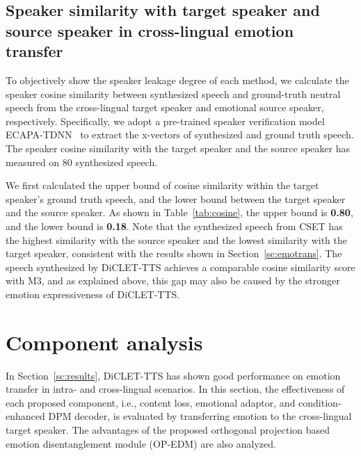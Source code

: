 \documentclass[journal,comsoc]{IEEEtran}
\begin{document}
\subsection{Speaker similarity with target speaker and source speaker in cross-lingual emotion transfer}

To objectively show the speaker leakage degree of each method, we calculate the speaker cosine similarity between synthesized speech and ground-truth neutral speech from the cross-lingual target speaker and emotional source speaker, respectively. 
Specifically, we adopt a pre-trained speaker verification model ECAPA-TDNN~\cite{TDNN} to extract the x-vectors of synthesized and ground truth speech. 
The speaker cosine similarity with the target speaker and the source speaker has measured on $80$ synthesized speech.

We first calculated the upper bound of cosine similarity within the target speaker's ground truth speech, and the lower bound between the target speaker and the source speaker. 
As shown in Table~\ref{tab:cosine}, the upper bound is \textbf{0.80}, and the lower bound is \textbf{0.18}.
Note that the synthesized speech from CSET has the highest similarity with the source speaker and the lowest similarity with the target speaker, consistent with the results shown in Section~\ref{sc:emotrans}.
The speech synthesized by DiCLET-TTS achieves a comparable cosine similarity score with M3, and as explained above, this gap may also be caused by the stronger emotion expressiveness of DiCLET-TTS. 

\vspace{-0.05cm}
\section{Component analysis}
\label{component}

In Section~\ref{sc:results}, DiCLET-TTS has shown good performance on emotion transfer in intra- and cross-lingual scenarios. 
In this section, the effectiveness of each proposed component, i.e., content loss, emotional adaptor, and condition-enhanced DPM decoder, is evaluated by transferring emotion to the cross-lingual target speaker.
The advantages of the proposed orthogonal projection based emotion disentanglement module (OP-EDM) are also analyzed. 

\vspace{-0.1cm}
\end{document}
